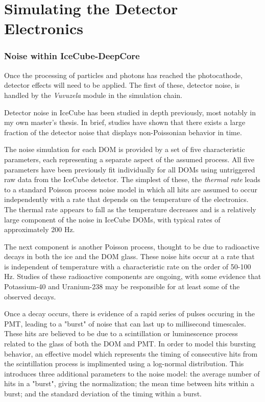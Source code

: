 \section{Simulating the Detector Electronics}
\subsubsection{Noise within IceCube-DeepCore}
Once the processing of particles and photons has reached the photocathode, detector effects will need to be applied. 
The first of these, detector noise, is handled by the \emph{Vuvuzela} module in the simulation chain. 

Detector noise in IceCube has been studied in depth previously, most notably in my own master's thesis. 
In brief, studies have shown that there exists a large fraction of the detector noise that displays non-Poissonian behavior in time.

The noise simulation for each DOM is provided by a set of five characteristic parameters, each representing a separate aspect of the assumed process. 
All five parameters have been previously fit individually for all DOMs using untriggered raw data from the IceCube detector. 
The simplest of these, the \emph{thermal rate} leads to a standard Poisson process noise model in which all hits are assumed to occur independently with a rate that depends on the temperature of the electronics. 
The thermal rate appears to fall as the temperature decreases and is a relatively large component of the noise in IceCube DOMs, with typical rates of approximately 200 Hz.

The next component is another Poisson process, thought to be due to radioactive decays in both the ice and the DOM glass. 
These noise hits occur at a rate that is independent of temperature with a characteristic rate on the order of 50-100 Hz. 
Studies of these radioactive components are ongoing, with some evidence that Potassium-40 and Uranium-238 may be responsible for at least some of the observed decays.

Once a decay occurs, there is evidence of a rapid series of pulses occuring in the PMT, leading to a "burst" of noise that can last up to millisecond timescales. 
These hits are believed to be due to a scintillation or luminescence process related to the glass of both the DOM and PMT. 
In order to model this bursting behavior, an effective model which represents the timing of consecutive hits from the scintillation process is implimented using a log-normal distribution. 
This introduces three additional parameters to the noise model: the average number of hits in a "burst", giving the normalization; the mean time between hits within a burst; and the standard deviation of the timing within a burst. 

